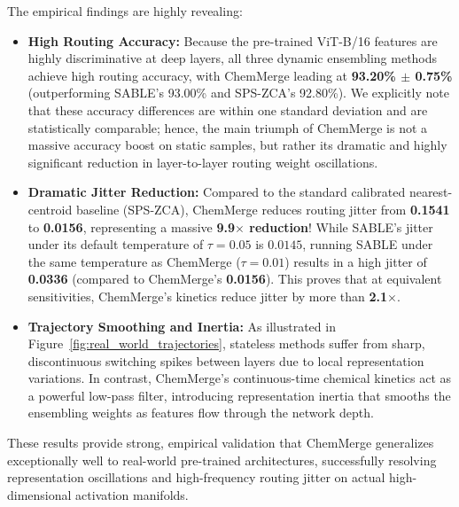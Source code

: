 The empirical findings are highly revealing:
\begin{itemize}
    \item \textbf{High Routing Accuracy:} Because the pre-trained ViT-B/16 features are highly discriminative at deep layers, all three dynamic ensembling methods achieve high routing accuracy, with ChemMerge leading at \textbf{93.20\% $\pm$ 0.75\%} (outperforming SABLE's 93.00\% and SPS-ZCA's 92.80\%). We explicitly note that these accuracy differences are within one standard deviation and are statistically comparable; hence, the main triumph of ChemMerge is not a massive accuracy boost on static samples, but rather its dramatic and highly significant reduction in layer-to-layer routing weight oscillations.
    \item \textbf{Dramatic Jitter Reduction:} Compared to the standard calibrated nearest-centroid baseline (SPS-ZCA), ChemMerge reduces routing jitter from \textbf{0.1541} to \textbf{0.0156}, representing a massive \textbf{9.9$\times$ reduction}! While SABLE's jitter under its default temperature of $\tau=0.05$ is $0.0145$, running SABLE under the same temperature as ChemMerge ($\tau=0.01$) results in a high jitter of \textbf{0.0336} (compared to ChemMerge's \textbf{0.0156}). This proves that at equivalent sensitivities, ChemMerge's kinetics reduce jitter by more than \textbf{2.1$\times$}.
    \item \textbf{Trajectory Smoothing and Inertia:} As illustrated in Figure~\ref{fig:real_world_trajectories}, stateless methods suffer from sharp, discontinuous switching spikes between layers due to local representation variations. In contrast, ChemMerge's continuous-time chemical kinetics act as a powerful low-pass filter, introducing representation inertia that smooths the ensembling weights as features flow through the network depth.
\end{itemize}
These results provide strong, empirical validation that ChemMerge generalizes exceptionally well to real-world pre-trained architectures, successfully resolving representation oscillations and high-frequency routing jitter on actual high-dimensional activation manifolds.


